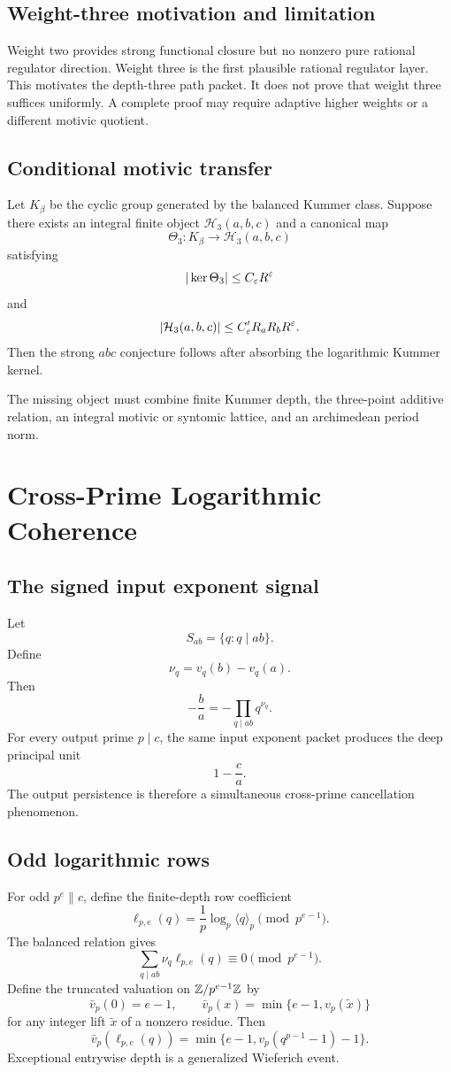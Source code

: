 \section{Weight-three motivation and limitation}
Weight two provides strong functional closure but no nonzero pure rational regulator direction. Weight three is the first plausible rational regulator layer. This motivates the depth-three path packet. It does not prove that weight three suffices uniformly. A complete proof may require adaptive higher weights or a different motivic quotient.

\section{Conditional motivic transfer}
Let $K_\beta$ be the cyclic group generated by the balanced Kummer class. Suppose there exists an integral finite object $\mathcal H_3(a,b,c)$ and a canonical map
\[
 \Theta_3:K_\beta\longrightarrow\mathcal H_3(a,b,c)
\]
satisfying
\[
 |\ker\Theta_3|\le C_\varepsilon R^\varepsilon
\]
and
\[
 |\mathcal H_3(a,b,c)|\le C'_\varepsilon R_aR_bR^\varepsilon.
\]
Then the strong $abc$ conjecture follows after absorbing the logarithmic Kummer kernel.

The missing object must combine finite Kummer depth, the three-point additive relation, an integral motivic or syntomic lattice, and an archimedean period norm.

\chapter{Cross-Prime Logarithmic Coherence}

\section{The signed input exponent signal}
Let
\[
 S_{ab}=\{q:q\mid ab\}.
\]
Define
\[
 \nu_q=v_q(b)-v_q(a).
\]
Then
\[
 -\frac ba=-\prod_{q\mid ab}q^{\nu_q}.
\]
For every output prime $p\mid c$, the same input exponent packet produces the deep principal unit
\[
 1-\frac ca.
\]
The output persistence is therefore a simultaneous cross-prime cancellation phenomenon.

\section{Odd logarithmic rows}
For odd $p^e\parallel c$, define the finite-depth row coefficient
\[
 \ell_{p,e}(q)
 =
 \frac1p\log_p\langle q\rangle_p
 \pmod{p^{e-1}}.
\]
The balanced relation gives
\[
 \boxed{
 \sum_{q\mid ab}
 \nu_q\ell_{p,e}(q)
 \equiv0
 \pmod{p^{e-1}}.
 }
\]
Define the truncated valuation on $\mathbb Z/p^{e-1}\mathbb Z$ by
\[
 \bar v_p(0)=e-1,
 \qquad
 \bar v_p(x)=\min\{e-1,v_p(\widetilde x)\}
\]
for any integer lift $\widetilde x$ of a nonzero residue. Then
\[
 \boxed{
 \bar v_p(\ell_{p,e}(q))
 =
 \min\{e-1,v_p(q^{p-1}-1)-1\}.
 }
\]
Exceptional entrywise depth is a generalized Wieferich event.

